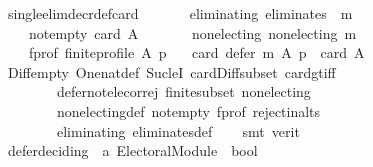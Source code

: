 \begin{isabellebody}
\ single{\isacharunderscore}{\kern0pt}elim{\isacharunderscore}{\kern0pt}decr{\isacharunderscore}{\kern0pt}def{\isacharunderscore}{\kern0pt}card{}{\isacharcolon}{\kern0pt}\isanewline
\ \ \isanewline
\ \ \ \ eliminating{\isacharcolon}{\kern0pt}\ {\isachardoublequoteopen}eliminates\ {}\ m{\isachardoublequoteclose}\ \isanewline
\ \ \ \ not{\isacharunderscore}{\kern0pt}empty{\isacharcolon}{\kern0pt}\ {\isachardoublequoteopen}card\ A\ {\isachargreater}{\kern0pt}\ {}{\isachardoublequoteclose}\ \isanewline
\ \ \ \ non{\isacharunderscore}{\kern0pt}electing{\isacharcolon}{\kern0pt}\ {\isachardoublequoteopen}non{\isacharunderscore}{\kern0pt}electing\ m{\isachardoublequoteclose}\ \isanewline
\ \ \ \ f{\isacharunderscore}{\kern0pt}prof{\isacharcolon}{\kern0pt}\ {\isachardoublequoteopen}finite{\isacharunderscore}{\kern0pt}profile\ A\ p{\isachardoublequoteclose}\isanewline
\ \ \ {\isachardoublequoteopen}card\ {\isacharparenleft}{\kern0pt}defer\ m\ A\ p{\isacharparenright}{\kern0pt}\ {\isacharequal}{\kern0pt}\ card\ A\ {\isacharminus}{\kern0pt}\ {}{\isachardoublequoteclose}\isanewline
%
\isadelimproof
\ \ %
\endisadelimproof
%
\isatagproof
{}\isamarkupfalse%
\ Diff{\isacharunderscore}{\kern0pt}empty\ One{\isacharunderscore}{\kern0pt}nat{\isacharunderscore}{\kern0pt}def\ Suc{\isacharunderscore}{\kern0pt}leI\ card{\isacharunderscore}{\kern0pt}Diff{\isacharunderscore}{\kern0pt}subset\ card{\isacharunderscore}{\kern0pt}gt{\isacharunderscore}{\kern0pt}{}{\isacharunderscore}{\kern0pt}iff\isanewline
\ \ \ \ \ \ \ \ defer{\isacharunderscore}{\kern0pt}not{\isacharunderscore}{\kern0pt}elec{\isacharunderscore}{\kern0pt}or{\isacharunderscore}{\kern0pt}rej\ finite{\isacharunderscore}{\kern0pt}subset\ non{\isacharunderscore}{\kern0pt}electing\isanewline
\ \ \ \ \ \ \ \ non{\isacharunderscore}{\kern0pt}electing{\isacharunderscore}{\kern0pt}def\ not{\isacharunderscore}{\kern0pt}empty\ f{\isacharunderscore}{\kern0pt}prof\ reject{\isacharunderscore}{\kern0pt}in{\isacharunderscore}{\kern0pt}alts\isanewline
\ \ \ \ \ \ \ \ eliminating\ eliminates{\isacharunderscore}{\kern0pt}def\isanewline
\ \ \isamarkupfalse%
\ {\isacharparenleft}{\kern0pt}smt\ {\isacharparenleft}{\kern0pt}verit{\isacharparenright}{\kern0pt}{\isacharparenright}{\kern0pt}%
\endisatagproof
{\isafoldproof}%
%
\isadelimproof
\isanewline
%
\endisadelimproof
\isanewline
\isanewline
{}\isamarkupfalse%
\ defer{\isacharunderscore}{\kern0pt}deciding\ {\isacharcolon}{\kern0pt}{\isacharcolon}{\kern0pt}\ {\isachardoublequoteopen}{\isacharprime}{\kern0pt}a\ Electoral{\isacharunderscore}{\kern0pt}Module\ {\isasymRightarrow}\ bool{\isachardoublequoteclose}\ \isanewline

\end{isabellebody}
